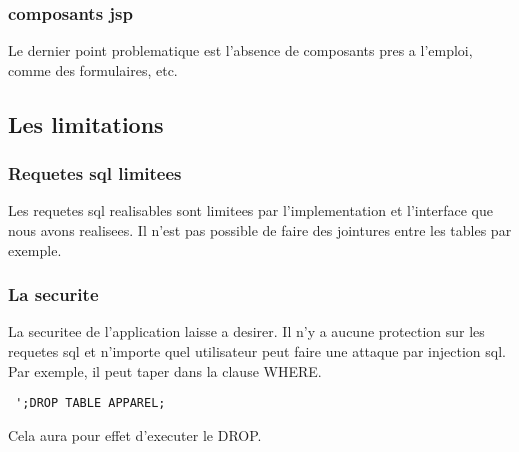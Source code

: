 \subsubsection{composants jsp}
Le dernier point problematique est l'absence de composants pres a l'emploi, comme des formulaires, etc.
\subsection{Les limitations}
\subsubsection{Requetes sql limitees}
Les requetes sql realisables sont limitees par l'implementation et l'interface que nous avons realisees. Il n'est pas possible de faire des jointures entre les tables par exemple.
\subsubsection{La securite}
La securitee de l'application laisse a desirer. Il n'y a aucune protection sur les requetes sql et n'importe quel utilisateur peut faire une attaque par injection sql. 
Par exemple, il peut taper dans la clause WHERE.
\begin{verbatim}
 ';DROP TABLE APPAREL;
\end{verbatim}
Cela aura pour effet d'executer le DROP.
